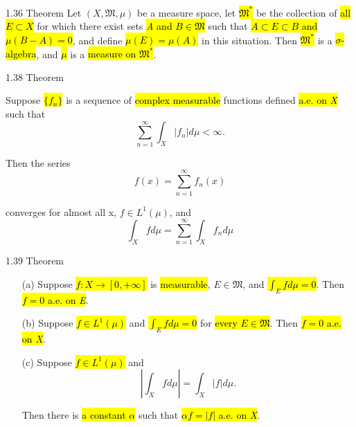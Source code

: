 \documentclass{article}
\begin{document}
\begin{theo}{1.36 Theorem}
Let $(X,\mathfrak{M},\mu)$ be a measure space, let \hl{$\mathfrak{M}^*$} be the collection of \hl{all $E\subset X$} for which there exist sets \hl{\textit{A} and $B\in\mathfrak{M}$} such that \hl{$A\subset E\subset B$ and $\mu(B-A)=0$}, and define \hl{$\mu(E)=\mu(A)$} in this situation. Then \hl{$\mathfrak{M}^*$} is a \hl{$\sigma$-algebra}, and \hl{$\mu$} is a \hl{measure on $\mathfrak{M}^*$}.
\end{theo}

\begin{theo}{1.38 Theorem}

Suppose \hl{$\{f_n\}$} is a sequence of \hl{complex measurable} functions defined \hl{a.e. on \textit{X}} such that
\begin{displaymath}
  \sum^\infty_{n=1}\int_X|f_n|d\mu<\infty.
\end{displaymath}

Then the series
\begin{displaymath}
  f(x)=\sum^\infty_{n=1}f_n(x)
\end{displaymath}

converges for almost all x, $f\in L^1(\mu)$, and
\begin{displaymath}
  \int_X fd\mu=\sum^\infty_{n=1}\int_Xf_nd\mu
\end{displaymath}


\end{theo}

\begin{theo}{1.39 Theorem}
\begin{enumerate}
  \item [(a)] Suppose \hl{$f: X \rightarrow [0,+\infty]$} is \hl{measurable}, $E\in\mathfrak{M}$, and \hl{$\int_E fd\mu=0$}. Then \hl{$f=0$ a.e. on \textit{E}}.
  \item [(b)] Suppose \hl{$f\in L^1(\mu)$} and \hl{$\int_E fd\mu=0$} for \hl{every $E\in\mathfrak{M}$}. Then \hl{$f=0$ a.e. on \textit{X}}.
  \item [(c)] Suppose \hl{$f\in L^1(\mu)$} and
  \begin{displaymath}
  |\int_X fd\mu|=\int_X|f|d\mu.
\end{displaymath}

Then there is \hl{a constant $\alpha$} such that \hl{$\alpha f=|f|$ a.e. on \textit{X}}.

\end{enumerate}

\end{theo}
\end{document}
